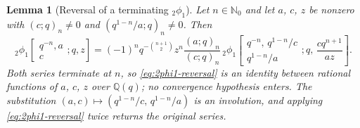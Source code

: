 \documentclass[11pt,oneside,openany]{book}
\newtheorem{lemma}[lemma]{Lemma}
\theoremstyle{definition}
\theoremstyle{remark}
\newcommand{\Q}{\mathbb Q}
\newcommand{\N}{\mathbb N}
\begin{document}
\begin{lemma}[Reversal of a terminating ${}_2\phi_1$]\label{lem:2phi1-reversal}
Let $n\in\N_0$ and let $a$, $c$, $z$ be nonzero with $(c;q)_n\ne0$ and $(q^{1-n}/a;q)_n\ne0$.  Then
\begin{equation}
 {}_2\phi_1\!\left[
 \begin{matrix}q^{-n},a\\c\end{matrix};q,z\right]
 =(-1)^nq^{-\binom{n+1}{2}}z^{n}\frac{(a;q)_n}{(c;q)_n}\,
 {}_2\phi_1\!\left[
 \begin{matrix}q^{-n},\,q^{1-n}/c\\[2pt] q^{1-n}/a\end{matrix};q,
 \,\frac{cq^{n+1}}{az}\right].
 \label{eq:2phi1-reversal}
\end{equation}
Both series terminate at $n$, so \eqref{eq:2phi1-reversal} is an identity between rational functions of $a$, $c$, $z$ over $\Q(q)$; no convergence hypothesis enters.  The substitution $(a,c)\mapsto(q^{1-n}/c,\,q^{1-n}/a)$ is an involution, and applying \eqref{eq:2phi1-reversal} twice returns the original series.
\end{lemma}
\end{document}
